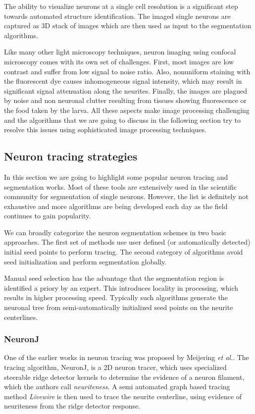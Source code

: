 The ability to visualize neurons at a single cell resolution is a significant step towards automated structure identification. The imaged single neurons are captured as 3D stack of images which are then used as input to the segmentation algorithms.

Like many other light microscopy techniques, neuron imaging using confocal microscopy comes with its own set of challenges. First, most images are low contrast and suffer from low signal to noise ratio. Also, nonuniform staining with the fluorescent dye causes inhomogeneous signal intensity, which may result in significant signal attenuation along the neurites. Finally, the images are plagued by noise and non neuronal clutter resulting from tissues showing fluorescence or the food taken by the larva. All these aspects make image processing challenging and the algorithms that we are going to discuss in the following section try to resolve this issues using sophisticated image processing techniques.  

\subsection{Neuron tracing strategies}

In this section we are going to highlight some popular neuron tracing and segmentation works. Most of these tools are extensively used in the scientific community for segmentation of single neurons. However, the list is  definitely not exhaustive and more algorithms are being developed each day as the field continues to gain popularity.

We can broadly categorize the neuron segmentation schemes in two basic approaches. The first set of methods use user defined (or automatically detected) initial seed points to perform tracing. The second category of algorithms avoid seed initialization and perform segmentation globally.

Manual seed selection has the advantage that the segmentation region is identified a priory by an expert. This introduces locality in processing, which results in higher processing speed. Typically such algorithms generate the neuronal tree from semi-automatically initialized seed points on the neurite centerlines.



\subsubsection{NeuronJ}
One of the earlier works in neuron tracing was proposed by Meijering \textit{et al.}\cite{meijering2004design}. The tracing algorithm, NeuronJ, is a 2D neuron tracer, which uses specialized steerable ridge detector kernels \cite{jacob2004steerable} to determine the evidence of a neuron filament, which the authors call \textit{neuriteness}. A semi automated graph based tracing method \textit{Livewire} \cite{livewire} is then used to trace the neurite centerline, using evidence of neuriteness from the ridge detector response. 

